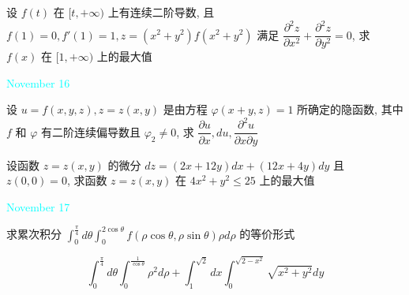 \begin{solution}
	
\end{solution}

\begin{example}[][Exam: 37.3.2]
	设 $f(t)$ 在 $[t,+\infty)$ 上有连续二阶导数, 且 $f(1)=0,f'(1)=1, z=(x^2+y^2)f(x^2+y^2)$ 
满足 $\dfrac{\partial^2 z}{\partial x^2}+\dfrac{\partial^2 z}{\partial y^2}=0$, 求 $f(x)$ 
在 $[1,+\infty)$ 上的最大值
\end{example}

\begin{solution}
	
\end{solution}


\textcolor{cyan}{November 16}

\begin{example}[][Exam: 37.3.3]
	设 $u=f(x,y,z), z=z(x,y)$ 是由方程 $\varphi(x+y,z)=1$ 所确定的隐函数,
其中 $f$ 和 $\varphi$ 有二阶连续偏导数且 $\varphi_{2}\neq 0$,
求 $\dfrac{\partial u}{\partial x},du,\dfrac{\partial^2 u}{\partial x\partial y}$
\end{example}

\begin{solution}
	
\end{solution}

\begin{example}[][Exam: 37.3.4]
	设函数 $z=z(x,y)$ 的微分 $dz=(2x+12y)dx+(12x+4y)dy$ 且 $z(0,0)=0$,
求函数 $z=z(x,y)$ 在 $4x^2+y^2\leq 25$ 上的最大值
\end{example}

\begin{solution}
	
\end{solution}


\textcolor{cyan}{November 17}

\begin{example}[][Exam: 37.3.5]
	求累次积分 $\displaystyle{\int_{0}^{\frac{\pi}{4}}d\theta\int_{0}^{2\cos\theta}f(\rho\cos\theta,\rho\sin\theta)\rho d\rho}$ 的等价形式
\end{example}

\begin{solution}
	
\end{solution}

\begin{example}[][Exam: 37.3.6]
	$$\int_{0}^{\frac{\pi}{4}}d\theta\int_{0}^{\frac{1}{\cos\theta}}\rho^2d\rho+\int_{1}^{\sqrt{2}}dx\int_{0}^{\sqrt{2-x^2}}\sqrt{x^2+y^2}dy$$
\end{example}

